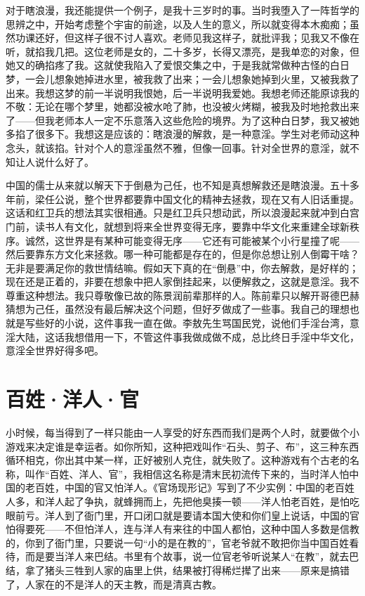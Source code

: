 对于瞎浪漫，我还能提供一个例子，是我十三岁时的事。当时我堕入了一阵哲学的思辨之中，开始考虑整个宇宙的前途，以及人生的意义，所以就变得本木痴痴；虽然功课还好，但这样子很不讨人喜欢。老师见我这样子，就批评我；见我又不像在听，就掐我几把。这位老师是女的，二十多岁，长得又漂亮，是我单恋的对象，但她又的确掐疼了我。这就使我陷入了爱恨交集之中，于是我就常做种古怪的白日梦，一会儿想象她掉进水里，被我救了出来；一会儿想象她掉到火里，又被我救了出来。我想这梦的前一半说明我恨她，后一半说明我爱她。我想老师还能原谅我的不敬：无论在哪个梦里，她都没被水呛了肺，也没被火烤糊，被我及时地抢救出来了——但我老师本人一定不乐意落入这些危险的境界。为了这种白日梦，我又被她多掐了很多下。我想这是应该的：瞎浪漫的解救，是一种意淫。学生对老师动这种念头，就该掐。针对个人的意淫虽然不雅，但像一回事。针对全世界的意淫，就不知让人说什么好了。 

中国的儒士从来就以解天下于倒悬为己任，也不知是真想解救还是瞎浪漫。五十多年前，梁任公说，整个世界都要靠中国文化的精神去拯救，现在又有人旧话重提。这话和红卫兵的想法其实很相通。只是红卫兵只想动武，所以浪漫起来就冲到白宫门前，读书人有文化，就想到将来全世界变得无序，要靠中华文化来重建全球新秩序。诚然，这世界是有某种可能变得无序——它还有可能被某个小行星撞了呢——然后要靠东方文化来拯救。哪一种可能都是存在的，但是你总想让别人倒霉干啥？无非是要满足你的救世情结嘛。假如天下真的在“倒悬”中，你去解救，是好样的；现在还是正着的，非要在想象中把人家倒挂起来，以便解救之，这就是意淫。我不尊重这种想法。我只尊敬像已故的陈景润前辈那样的人。陈前辈只以解开哥德巴赫猜想为己任，虽然没有最后解决这个问题，但好歹做成了一些事。我自己的理想也就是写些好的小说，这件事我一直在做。李敖先生骂国民党，说他们手淫台湾，意淫大陆，这话我想借用一下，不管这件事我做成做不成，总比终日手淫中华文化，意淫全世界好得多吧。

\chapter{百姓·洋人·官}

小时候，每当得到了一样只能由一人享受的好东西而我们是两个人时，就要做个小游戏来决定谁是幸运者。如你所知，这种把戏叫作“石头、剪子、布”，这三种东西循环相克，你出其中某一样，正好被别人克住，就失败了。这种游戏有个古老的名称，叫作“百姓、洋人、官”，我相信这名称是清末民初流传下来的，当时洋人怕中国的老百姓，中国的官又怕洋人。《官场现形记》写到了不少实例：中国的老百姓人多，和洋人起了争执，就蜂拥而上，先把他臭揍一顿——洋人怕老百姓，是怕吃眼前亏。洋人到了衙门里，开口闭口就是要请本国大使和你们皇上说话，中国的官怕得要死——不但怕洋人，连与洋人有来往的中国人都怕，这种中国人多数是信教的，你到了衙门里，只要说一句“小的是在教的”，官老爷就不敢把你当中国百姓看待，而是要当洋人来巴结。书里有个故事，说一位官老爷听说某人“在教”，就去巴结，拿了猪头三牲到人家的庙里上供，结果被打得稀烂撵了出来——原来是搞错了，人家在的不是洋人的天主教，而是清真古教。 

